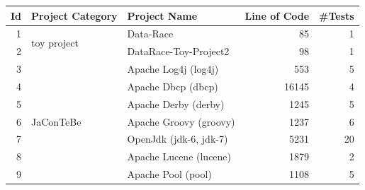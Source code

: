\begin{table}
	\begin{tabular}{|r|l|l|r|r|}
		\hline
		\textbf{Id} & \textbf{Project Category}   & \textbf{Project Name}                                                                       & \textbf{Line of Code} & \textbf{\#Tests} \\ \hline
		1           & \multirow{2}{*}{toy project} & Data-Race                                                                                    & 85                      & 1                       \\ \cline{1-1} \cline{3-5} 
		2           &                              & DataRace-Toy-Project2                                                                        & 98                      & 1                       \\ \hline
		3           & \multirow{7}{*}{JaConTeBe}   & Apache Log4j (log4j)                                                                         & 553                     & 5                       \\ \cline{1-1} \cline{3-5} 
		4           &                              & Apache Dbcp (dbcp)                                                                           & 16145                   & 4                       \\ \cline{1-1} \cline{3-5} 
		5           &                              & Apache Derby (derby)                                                                         & 1245                    & 5                       \\ \cline{1-1} \cline{3-5} 
		6           &                              & Apache Groovy (groovy)                                                                       & 1237                    & 6                       \\ \cline{1-1} \cline{3-5} 
		7           &                              & OpenJdk (jdk-6, jdk-7)                                                                       & 5231                    & 20                      \\ \cline{1-1} \cline{3-5} 
		8           &                              & Apache Lucene (lucene)                                                                       & 1879                    & 2                       \\ \cline{1-1} \cline{3-5} 
		9           &                              & Apache Pool (pool)                                                                           & 1108                    & 5                       \\ \hline

\end{tabular}
\end{table}
